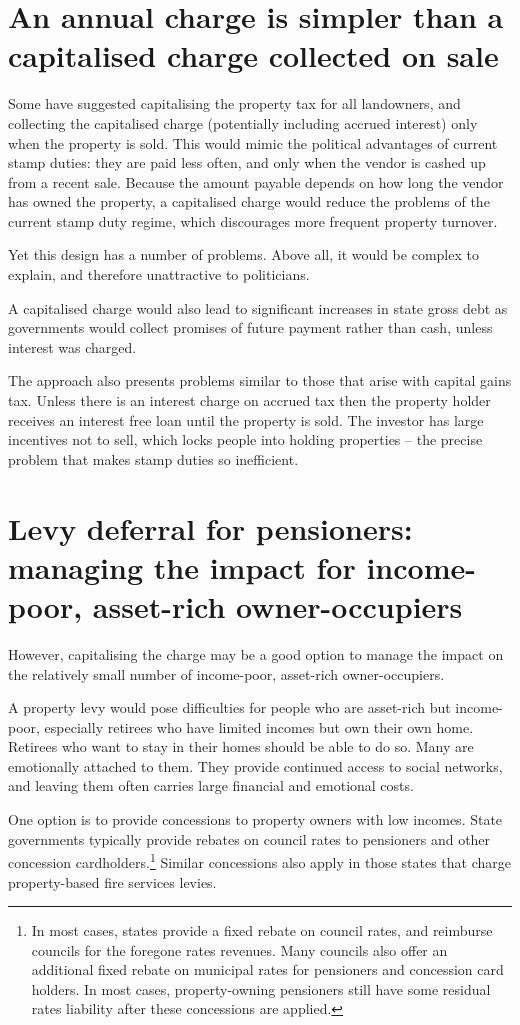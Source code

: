 \documentclass[twoside,english]{grattanBudgetRepairb5portrait}
\begin{document}
\section{\label{sec:PROP-6-4}An annual charge is simpler than a capitalised charge collected on sale}
Some have suggested capitalising the property tax for all landowners, and collecting the capitalised charge (potentially including accrued interest) only when the property is sold.  This would mimic the political advantages of current stamp duties: they are paid less often, and only when the vendor is cashed up from a recent sale. Because the amount payable depends on how long the vendor has owned the property, a capitalised charge would reduce the problems of the current stamp duty regime, which discourages more frequent property turnover.

Yet this design has a number of problems. Above all, it would be complex to explain, and therefore unattractive to politicians. 

A capitalised charge would also lead to significant increases in state gross debt as governments would collect promises of future payment rather than cash, unless interest was charged. 

The approach also presents problems similar to those that arise with capital gains tax. Unless there is an interest charge on accrued tax then the property holder receives an interest free loan until the property is sold. The investor has large incentives not to sell, which locks people into holding properties – the precise problem that makes stamp duties so inefficient. 


\section{Levy deferral for pensioners: managing the impact for income-poor, asset-rich owner-occupiers\label{sec:PROP-6-5}}
However, capitalising the charge may be a good option to manage the impact on the relatively small number of income-poor, asset-rich owner-occupiers.

A property levy would pose difficulties for people who are asset-rich but income-poor, especially retirees who have limited incomes but own their own home. Retirees who want to stay in their homes should be able to do so. Many are emotionally attached to them. They provide continued access to social networks, and leaving them often carries large financial and emotional costs. 

One option is to provide concessions to property owners with low incomes. State governments typically provide rebates on council rates to pensioners and other concession cardholders.\footnote{In most cases, states provide a fixed rebate on council rates, and reimburse councils for the foregone rates revenues. Many councils also offer an additional fixed rebate on municipal rates for pensioners and concession card holders. In most cases, property-owning pensioners still have some residual rates liability after these concessions are applied.}  Similar concessions also apply in those states that charge property-based fire services levies. 
\end{document}
